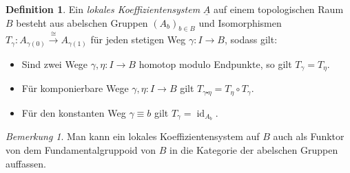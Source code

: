 \documentclass[11pt, a4paper, german]{article}
\theoremstyle{definition}
\newtheorem*{bsp}{Beispiel}
\newtheorem*{defn}{Definition}
\theoremstyle{remark}
\newtheorem*{bem}{Bemerkung}
\DeclareMathOperator{\id}{id} %
\begin{document}
\iffalse

Sei im Folgenden $B$ wegzusammenhängend.
Wir haben gezeigt, dass dann alle Fasern diesselbe Kohomologiegruppen besitzen.
Wir können also von der Kohomologie der Faser $F$ sprechen, wobei $F \coloneqq p^{-1}(b_0)$ für ein beliebiges $b_0 \in B$.
Die Fundamentalgruppe $\pi_1(B, b_0)$ operiert auf $H^*(F)$ durch $[\gamma] \mapsto T_\gamma$.

\begin{defn}
  Ein \emph{Bündel von Gruppen} auf einem topologischen Raum $B$ besteht aus einer Gruppe $G$, einer Abbildung $q : A \to B$ und Bijektionen $g_b : q^{-1}(b) \xrightarrow{\cong} G$ für alle $b \in B$, welche den Fasern von $q$ eine zu $G$ isomorphe Gruppenstruktur verleihen, sodass gilt:
  Für jeden Punkt $x \in B$ gibt es eine Umgebung $U \subset B$, sodass
  \[
    g_U : q^{-1}(U) \to U \times G, \quad
    y \mapsto (q(y), g_{q(y)}(y))
  \]
  stetig und sogar ein Homöomorphismus ist.
\end{defn}

\begin{bsp}
  Sei $G$ eine Gruppe.
  Die Projektion $B \times G \to B$ ist in kanonischer Weise ein Bündel von Gruppen auf $B$.
\end{bsp}
\fi


\begin{defn}
  Ein \emph{lokales Koeffizientensystem} $\underline{A}$ auf einem topologischen Raum $B$ besteht aus abelschen Gruppen $(A_b)_{b \in B}$ und Isomorphismen $T_\gamma : A_{\gamma(0)} \xrightarrow{\cong} A_{\gamma(1)}$ für jeden stetigen Weg $\gamma : I \to B$, sodass gilt:
  \begin{itemize}
    \item Sind zwei Wege $\gamma, \eta : I \to B$ homotop modulo Endpunkte, so gilt $T_\gamma = T_\eta$.
    \item Für komponierbare Wege $\gamma, \eta : I \to B$ gilt $T_{\gamma \centerdot \eta} = T_\eta \circ T_\gamma$.
    \item Für den konstanten Weg $\gamma \equiv b$ gilt $T_\gamma = \id_{A_b}$.
  \end{itemize}
\end{defn}

\begin{bem}
  Man kann ein lokales Koeffizientensystem auf $B$ auch als Funktor von dem Fundamentalgruppoid von $B$ in die Kategorie der abelschen Gruppen auffassen.
\end{bem}
\end{document}
